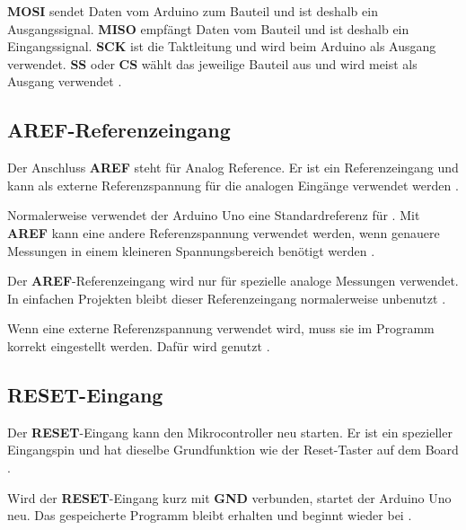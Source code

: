\textbf{MOSI} sendet Daten vom Arduino zum Bauteil und ist deshalb ein Ausgangssignal. \textbf{MISO} empfängt Daten vom Bauteil und ist deshalb ein Eingangssignal. \textbf{SCK} ist die Taktleitung und wird beim Arduino als Ausgang verwendet. \textbf{SS} oder \textbf{CS} wählt das jeweilige Bauteil aus und wird meist als Ausgang verwendet \cite{arduino:language-reference}.




\subsection{AREF-Referenzeingang}



Der Anschluss \textbf{AREF} steht für Analog Reference. Er ist ein Referenzeingang und kann als externe Referenzspannung für die analogen Eingänge verwendet werden \cite{arduino:uno-datasheet}.

Normalerweise verwendet der Arduino Uno eine Standardreferenz für . Mit \textbf{AREF} kann eine andere Referenzspannung verwendet werden, wenn genauere Messungen in einem kleineren Spannungsbereich benötigt werden \cite{arduino:analogread}.



Der \textbf{AREF}-Referenzeingang wird nur für spezielle analoge Messungen verwendet. In einfachen Projekten bleibt dieser Referenzeingang normalerweise unbenutzt \cite{arduino:uno-components}.

Wenn eine externe Referenzspannung verwendet wird, muss sie im Programm korrekt eingestellt werden. Dafür wird  genutzt \cite{arduino:analogread}.



\subsection{RESET-Eingang}



Der \textbf{RESET}-Eingang kann den Mikrocontroller neu starten. Er ist ein spezieller Eingangspin und hat dieselbe Grundfunktion wie der Reset-Taster auf dem Board \cite{arduino:uno-datasheet}\cite{arduino:uno-components}.



Wird der \textbf{RESET}-Eingang kurz mit \textbf{GND} verbunden, startet der Arduino Uno neu. Das gespeicherte Programm bleibt erhalten und beginnt wieder bei  \cite{arduino:uno-components}\cite{arduino:language-reference}.


